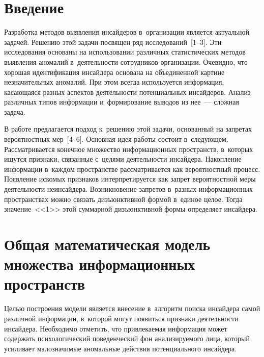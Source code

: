 



\thispagestyle{headings}

\begin{multicols}{2}

\label{st\stat}

\section{Введение}

  Разработка методов выявления инсайдеров в~организации является 
актуальной задачей. Решению этой задачи посвящен ряд исследований~[1--3]. 
Эти исследования основаны на использовании различных статистических 
методов выявления аномалий в~деятельности сотрудников организации. 
Очевидно, что хорошая идентификация инсайдера основана на объединенной 
картине незначительных аномалий. При этом всегда используется информация, 
касающаяся разных аспектов деятельности потенциальных инсайдеров. Анализ 
различных типов информации и~формирование выводов из нее~--- сложная 
задача. 
  
  В работе предлагается подход к~решению этой задачи, основанный на 
запретах вероятностных мер~[4--6]. Основная идея работы состоит 
в~сле\-ду\-ющем. Рассматривается конечное множество информационных 
пространств, в~которых ищутся признаки, связанные с~целями деятельности 
инсайдера. Накопление информации в~каждом пространстве рассматривается 
как вероятностный процесс. Появление искомых признаков интерпретируется 
как запрет вероятностной меры деятельности неинсайдера. Возникновение 
запретов в~разных информационных пространствах можно связать 
дизъюнктивной формой в~единое целое. Тогда значение~<<1>> этой суммарной 
дизъюнктивной формы определяет инсайдера. 
  
\section{Общая математическая модель множества информационных 
пространств}

  Целью построения модели является внесение в~алгоритм поиска инсайдера 
самой различной информации, в~которой могут появиться признаки 
деятельности инсайдера. Необходимо отметить, что привлекаемая информация 
может содержать психологический поведенческий фон анализируемого лица, 
который усиливает малозначимые аномальные действия потенциального 
инсайдера. 
  

\end{multicols}
